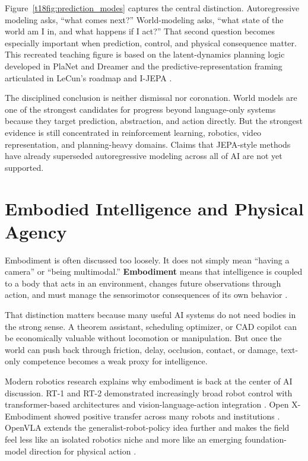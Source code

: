 \documentclass[12pt]{article}
\begin{document}
Figure~\ref{t18fig:prediction_modes} captures the central distinction. Autoregressive modeling asks, ``what comes next?'' World-modeling asks, ``what state of the world am I in, and what happens if I act?'' That second question becomes especially important when prediction, control, and physical consequence matter. This recreated teaching figure is based on the latent-dynamics planning logic developed in PlaNet and Dreamer and the predictive-representation framing articulated in LeCun's roadmap and I-JEPA \cite{hafner2019planet,hafner2020dreamer,lecun2022path,assran2023ijepa}.

The disciplined conclusion is neither dismissal nor coronation. World models are one of the strongest candidates for progress beyond language-only systems because they target prediction, abstraction, and action directly. But the strongest evidence is still concentrated in reinforcement learning, robotics, video representation, and planning-heavy domains. Claims that JEPA-style methods have already superseded autoregressive modeling across all of AI are not yet supported.

\section{Embodied Intelligence and Physical Agency}

Embodiment is often discussed too loosely. It does not simply mean ``having a camera'' or ``being multimodal.'' \textbf{Embodiment} means that intelligence is coupled to a body that acts in an environment, changes future observations through action, and must manage the sensorimotor consequences of its own behavior \cite{brooks1990elephants,brooks1991representation}.

That distinction matters because many useful AI systems do not need bodies in the strong sense. A theorem assistant, scheduling optimizer, or CAD copilot can be economically valuable without locomotion or manipulation. But once the world can push back through friction, delay, occlusion, contact, or damage, text-only competence becomes a weak proxy for intelligence.

Modern robotics research explains why embodiment is back at the center of AI discussion. RT-1 and RT-2 demonstrated increasingly broad robot control with transformer-based architectures and vision-language-action integration \cite{brohan2022rt1,brohan2023rt2}. Open X-Embodiment showed positive transfer across many robots and institutions \cite{openx2023rtx}. OpenVLA extends the generalist-robot-policy idea further and makes the field feel less like an isolated robotics niche and more like an emerging foundation-model direction for physical action \cite{kim2025openvla}.
\end{document}
